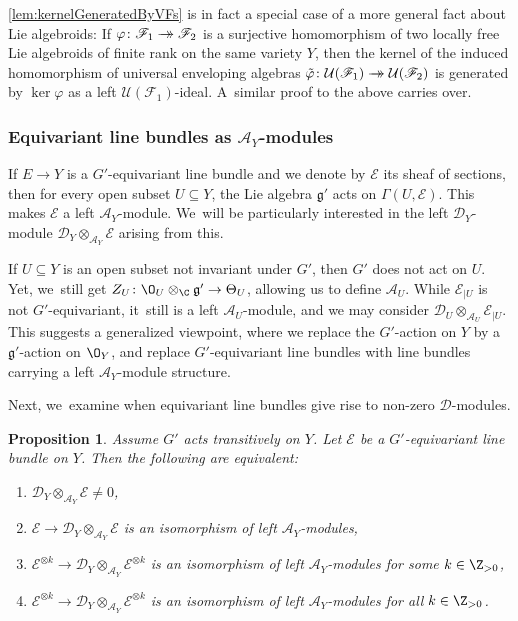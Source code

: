 \documentclass[JEP,XML,SOM,Unicode,published]{cedram}
\newcommand{\onto}{\mathchoice{\to\hspace*{-5mm}\to}{\to\hspace*{-2.85mm}\to}{\to\hspace*{-3mm}\to}{\to\hspace*{-3mm}\to}}
\newtheorem{prop}[thm]{Proposition}
\newcommand{\cA}{\mathscr{A}}
\newcommand{\frg}{\mathfrak{g}}
\newcommand\restr[2]{{#1_{| {#2}}}}
\begin{document}
\cref{lem:kernelGeneratedByVFs} is in fact a special case of a more general fact about Lie algebroids: If $\varphi \colon \mathscr F_1 \onto \mathscr F_2$ is a surjective homomorphism of two locally free Lie algebroids of finite rank on the same variety $Y$, then the kernel of the induced homomorphism of universal enveloping algebras $\tilde{\varphi} \colon \mathcal U(\mathscr F_1) \onto \mathcal U(\mathscr F_2)$ is generated by $\ker \varphi$ as a left $\mathcal U(\mathscr F_1)$-ideal. A~similar proof to the above carries over.

\subsubsection*{Equivariant line bundles as \texorpdfstring{$\cA_Y$}{A\_Y}\nobreakdash-mod\-ules} If $E \to Y$ is a $G'$-equivariant line bundle and we denote by $\mathscr{E}$ its sheaf of sections, then for every open subset $U \subseteq Y$, the Lie algebra $\frg'$ acts on $\Gamma(U,\mathscr{E})$. This makes $\mathscr{E}$ a left $\cA_Y$\nobreakdash-mod\-ule. We~will be particularly interested in the left $\mathscr D_Y$\nobreakdash-mod\-ule
$\mathscr{D}_Y \otimes_{\cA_Y} \mathscr{E}$ arising from this.

\begin{rmk}
If $U \subseteq Y$ is an open subset not invariant under $G'$, then $G'$ does not act on $U$. Yet, we~still get $Z_U \colon \O_U \otimes_\C \frg' \to \Theta_U$, allowing us to define $\cA_U$.
While $\restr{\mathscr{E}}{U}$ is not $G'$-equivariant, it~still is a left $\cA_U$\nobreakdash-mod\-ule, and we may consider $\mathscr{D}_U \otimes_{\cA_U} \restr{\mathscr{E}}{U}$. This suggests a generalized viewpoint, where we replace the $G'$-action on $Y$ by a $\frg'$\nobreakdash-action on $\O_Y$, and replace $G'$-equivariant line bundles with line bundles carrying a left $\cA_Y$\nobreakdash-mod\-ule structure.
\end{rmk}

Next, we~examine when equivariant line bundles give rise to non-zero $\mathscr{D}$\nobreakdash-mod\-ules.

\begin{prop} \label{prop:nonZeroIndependentOfPower}
Assume $G'$ acts transitively on $Y$. Let $\mathscr{E}$ be a $G'$-equivariant line bundle on $Y$. Then the following are equivalent:
\begin{enumerate}
\item\label{item:nonZero} $\mathscr D_Y \otimes_{\cA_Y} \mathscr E \neq 0$, 
\item\label{item:natIsom} $\mathscr E \to \mathscr D_Y \otimes_{\cA_Y} \mathscr E$ is an isomorphism of left $\cA_Y$\nobreakdash-mod\-ules,
\item\label{item:natIsomSomePower} $\mathscr E^{\otimes k} \to \mathscr D_Y \otimes_{\cA_Y} \mathscr E^{\otimes k}$ is an isomorphism of left $\cA_Y$\nobreakdash-mod\-ules for some $k \in \Z_{>0}$,
\item\label{item:natIsomAllPowers} $\mathscr E^{\otimes k} \to \mathscr D_Y \otimes_{\cA_Y} \mathscr E^{\otimes k}$ is an isomorphism of left $\cA_Y$\nobreakdash-mod\-ules for all $k \in \Z_{>0}$.
\end{enumerate}
\end{prop}
\end{document}
